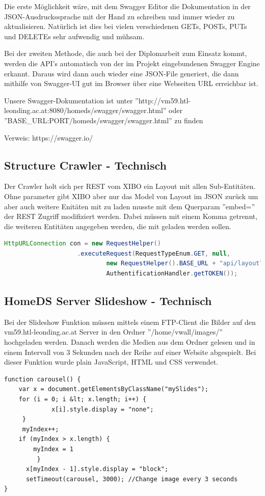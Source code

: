 Die erste Möglichkeit wäre, mit dem Swagger Editor die Dokumentation in der JSON-Ausdruckssprache mit der Hand zu schreiben und immer wieder zu aktualisieren. Natürlich ist dies bei vielen verschiedenen GETs, POSTs, PUTs und DELETEs sehr aufwendig und mühsam.

Bei der zweiten Methode, die auch bei der Diplomarbeit zum Einsatz kommt, werden die API's automatisch von der im Projekt eingebundenen Swagger Engine erkannt. Daraus wird dann auch wieder eine JSON-File generiert, die dann mithilfe von Swagger-UI gut im Browser über eine Webseiten URL erreichbar ist.

Unsere Swagger-Dokumentation ist unter ''http://vm59.htl-leonding.ac.at:8080/homeds/swagger/swagger.html'' oder ''BASE_URL:PORT/homeds/swagger/swagger.html'' zu finden


Verweis: https://swagger.io/

\subsection{Structure Crawler - Technisch}\label{sec:structurecrawlertechnical}
Der Crawler holt sich per REST vom XIBO ein Layout mit allen Sub-Entitäten. Ohne parameter gibt XIBO aber nur das Model von Layout im JSON zurück um aber auch weitere Enitäten mit zu laden musste mit dem Querparam  ''embed='' der REST Zugriff modifiziert werden. Dabei müssen mit einem Komma getrennt, die weiteren Entitäten angegeben werden, die mit geladen werden sollen.

\begin{lstlisting}[language=Java, caption={Crawler GET Request}]
HttpURLConnection con = new RequestHelper()
                    .executeRequest(RequestTypeEnum.GET, null,
                            new RequestHelper().BASE_URL + "api/layout?" + "embed=regions,playlists,widgets,widgetOptions" + query,
                            AuthentificationHandler.getTOKEN());
\end{lstlisting}

\subsection{HomeDS Server Slideshow - Technisch}\label{sec:slideshowtechnical}
Bei der Slideshow Funktion müssen mittels einem FTP-Client die Bilder auf den vm59.htl-leonding.ac.at Server in den Ordner ''/home/vwall/images/'' hochgeladen werden. Danach werden die Medien aus dem Ordner gelesen und in einem Intervall von 3 Sekunden nach der Reihe auf einer Website abgespielt. Bei dieser Funktion wurde plain JavaScript, HTML und CSS verwendet.

\begin{lstlisting}[caption={Carousel JavaScript}]
function carousel() {
    var x = document.getElementsByClassName("mySlides");
    for (i = 0; i &lt; x.length; i++) {
    		 x[i].style.display = "none";
  	 }
     myIndex++;
   	if (myIndex > x.length) {
   		myIndex = 1
    	 }
      x[myIndex - 1].style.display = "block";
      setTimeout(carousel, 3000); //Change image every 3 seconds
}
\end{lstlisting}

